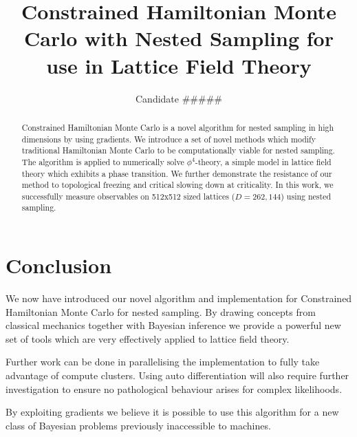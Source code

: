\documentclass[aps,prd,reprint,preprintnumbers,showpacs,floatfix,nofootinbib,superscript address]{revtex4-2}
\begin{document}
\title{Constrained Hamiltonian Monte Carlo with Nested Sampling for use in Lattice Field Theory}

\author{Candidate \#\#\#\#\#}

\begin{abstract}
     Constrained Hamiltonian Monte Carlo is a novel algorithm for nested sampling in high dimensions by using gradients.
     We introduce a set of novel methods which modify traditional Hamiltonian Monte Carlo to be computationally viable for
     nested sampling.
     The algorithm is applied to numerically solve $\phi^4$-theory, a simple model in lattice field theory which
     exhibits a phase transition.
     We further demonstrate the resistance of our method to topological freezing and critical slowing down at criticality.
     In this work, we successfully measure observables on 512x512 sized lattices ($D=262,144$) using nested sampling.
\end{abstract}


\maketitle



















\section{Conclusion}\label{sec:conclusion}
     We now have introduced our novel algorithm and implementation for Constrained Hamiltonian Monte Carlo for nested sampling.
     By drawing concepts from classical mechanics together with Bayesian inference we provide a powerful
     new set of tools which are very effectively applied to lattice field theory.

     Further work can be done in parallelising the implementation to fully take advantage of compute clusters.
     Using auto differentiation will also require further investigation to ensure no pathological behaviour arises for
     complex likelihoods.

     By exploiting gradients we believe it is possible to use this algorithm for a new class of
     Bayesian problems previously inaccessible to machines.






\end{document}

